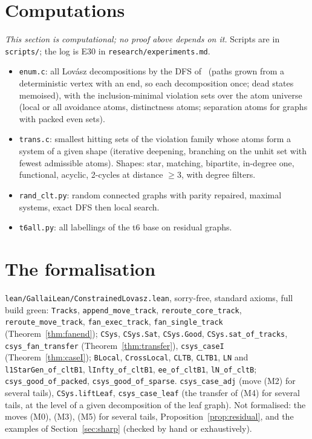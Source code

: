 \documentclass[11pt]{amsart}
\theoremstyle{definition}
\begin{document}
\section{Computations}\label{sec:comp}
\emph{This section is computational; no proof above depends on it.} Scripts are in
\texttt{scripts/}; the log is E30 in \texttt{research/experiments.md}.
\begin{itemize}
\item \texttt{enum.c}: all Lov\'asz decompositions by the DFS of~\cite{STL,T6} (paths grown from a
deterministic vertex with an end, so each decomposition once; dead states memoised), with the
inclusion-minimal violation sets over the atom universe (local or all avoidance atoms, distinctness
atoms; separation atoms for graphs with packed even sets).
\item \texttt{trans.c}: smallest hitting sets of the violation family whose atoms form a system of a
given shape (iterative deepening, branching on the unhit set with fewest admissible atoms). Shapes:
star, matching, bipartite, in-degree one, functional, acyclic, 2-cycles at distance $\ge3$, with
degree filters.
\item \texttt{rand\_clt.py}: random connected graphs with parity repaired, maximal systems, exact
DFS then local search.
\item \texttt{t6all.py}: all labellings of the t6 base on residual graphs.
\end{itemize}

\section{The formalisation}\label{sec:lean}
\texttt{lean/GallaiLean/ConstrainedLovasz.lean}, sorry-free, standard axioms, full build green:
\texttt{Tracks}, \texttt{append\_move\_track}, \texttt{reroute\_core\_track},
\texttt{reroute\_move\_track}, \texttt{fan\_exec\_track}, \texttt{fan\_single\_track}
(Theorem~\ref{thm:fanend}); \texttt{CSys}, \texttt{CSys.Sat}, \texttt{CSys.Good},
\texttt{CSys.sat\_of\_tracks}, \texttt{csys\_fan\_transfer} (Theorem~\ref{thm:transfer}),
\texttt{csys\_caseI} (Theorem~\ref{thm:caseI}); \texttt{BLocal}, \texttt{CrossLocal},
\texttt{CLTB}, \texttt{CLTB1}, \texttt{LN} and \texttt{l1StarGen\_of\_cltB1},
\texttt{lInfty\_of\_cltB1}, \texttt{ee\_of\_cltB1}, \texttt{lN\_of\_cltB};
\texttt{csys\_good\_of\_packed}, \texttt{csys\_good\_of\_sparse}. \texttt{csys\_case\_adj} (move (M2) for several tails), \texttt{CSys.liftLeaf},
\texttt{csys\_case\_leaf} (the transfer of (M4) for several tails, at the level of a given
decomposition of the leaf graph). Not formalised: the moves (M0), (M3), (M5) for several tails, Proposition~\ref{prop:residual}, and the examples of
Section~\ref{sec:sharp} (checked by hand or exhaustively).
\end{document}
